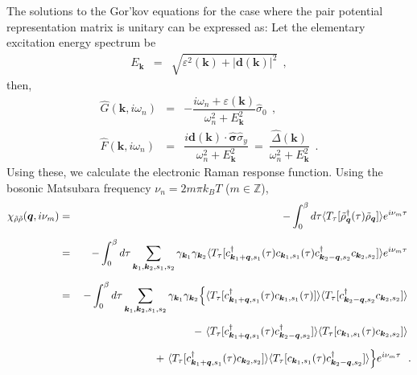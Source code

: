 \documentclass[a4j]{jsarticle}
\begin{document}
The solutions to the Gor'kov equations for the case where the pair potential representation matrix is unitary can be expressed as:
Let the elementary excitation energy spectrum be
%
%
%
%
\begin{eqnarray}
	E_{\bm{k}}
	&=&
	\sqrt{
		\varepsilon^{2}(\bm{k}) + | \bm{d}(\bm{k}) |^{2}
	}
	\ \ ,
\end{eqnarray}
%
%
%
%
then,
%
%
%
%
\begin{eqnarray}
	\hat{G}(\bm{k} , i \omega_{n})
	&=&
	-
	\dfrac{ i \omega_{n} + \varepsilon(\bm{k}) }
	{ \omega_{n}^{2} + E_{\bm{k}}^{2} }
	\hat{\sigma}_{0}
	\ \ ,
	\\[2mm]
	\hat{F}(\bm{k},i \omega_{n})
	&=&
	\dfrac{ i \bm{d}(\bm{k}) \cdot \hat{\bm{\sigma}} \hat{\sigma}_{y} }
	{ \omega_{n}^{2} + E_{\bm{k}}^{2} }
	\ = \
	\dfrac{ \hat{\Delta}(\bm{k}) }
	{ \omega_{n}^{2} + E_{\bm{k}}^{2} }
	\ \ .
\end{eqnarray}
%
%
%
%
Using these, we calculate the electronic Raman response function.
Using the bosonic Matsubara frequency $\nu_{n}=2m\pi k_{B} T$ ($m \in \mathbb{Z}$),
%
%
%
%
\begin{eqnarray}
	\chi_{\tilde{\rho} \tilde{\rho}}(\bm{q},i \nu_{m})
	&=&
	-
	\int^{\beta}_{0} d \tau
	\langle T_{\tau}[ \tilde{\rho}_{\bm{q}}^{\dagger} (\tau) \tilde{\rho}_{\bm{q}} ] \rangle
	e^{i \nu_{m} \tau}
	\nonumber \ \\[2mm]
	&=&
	-
	\int^{\beta}_{0} d \tau
	\sum_{\bm{k}_{1} , \bm{k}_{2} , s_{1} ,s_{2} }
	\gamma_{\bm{k}_{1}}
	\gamma_{\bm{k}_{2}}
	\langle T_{\tau} [
			c_{ \bm{k}_{1}+\bm{q} , s_{1} }^{\dagger} (\tau)
			c_{ \bm{k}_{1} , s_{1} } (\tau)
			c_{ \bm{k}_{2}-\bm{q} , s_{2} }^{\dagger}
			c_{ \bm{k}_{2} , s_{2} }
		] \rangle
	e^{i \nu_{m} \tau}
	\nonumber \ \\[2mm]
	&=&
	-
	\int^{\beta}_{0} d \tau
	\sum_{\bm{k}_{1} , \bm{k}_{2} , s_{1} ,s_{2} }
	\gamma_{\bm{k}_{1}}
	\gamma_{\bm{k}_{2}}
	\Big\{
	\langle T_{\tau} [
			c_{ \bm{k}_{1}+\bm{q} , s_{1} }^{\dagger} (\tau)
			c_{ \bm{k}_{1} , s_{1} } (\tau)
		] \rangle
	\langle T_{\tau} [
			c_{ \bm{k}_{2}-\bm{q} , s_{2} }^{\dagger}
			c_{ \bm{k}_{2} , s_{2} }
		] \rangle
	\nonumber \ \\[2mm]
	&& \hspace{25mm} - \
	\langle T_{\tau} [
			c_{ \bm{k}_{1}+\bm{q} , s_{1} }^{\dagger} (\tau)
			c_{ \bm{k}_{2}-\bm{q} , s_{2} }^{\dagger}
		] \rangle
	\langle T_{\tau} [
			c_{ \bm{k}_{1} , s_{1} } (\tau)
			c_{ \bm{k}_{2} , s_{2} }
		] \rangle
	\nonumber \ \\[2mm]
	&& \hspace{25mm} + \
	\langle T_{\tau} [
			c_{ \bm{k}_{1}+\bm{q} , s_{1} }^{\dagger} (\tau)
			c_{ \bm{k}_{2} , s_{2} }
		] \rangle
	\langle T_{\tau} [
			c_{ \bm{k}_{1} , s_{1} } (\tau)
			c_{ \bm{k}_{2}-\bm{q} , s_{2} }^{\dagger}
		] \rangle
	\Big\}
	e^{i \nu_{m} \tau}
	\ \ .
\end{eqnarray}
\end{document}
